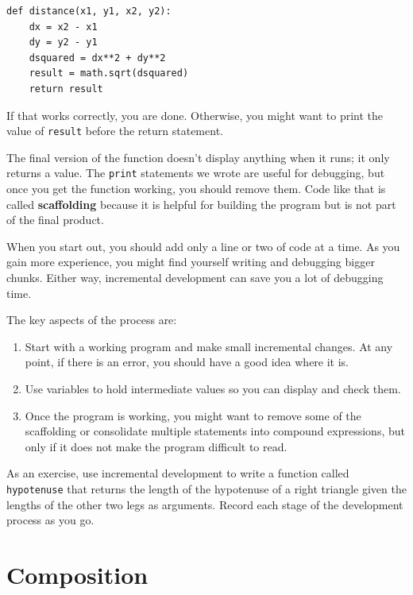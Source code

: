 \documentclass[10pt]{book}
\begin{document}
\begin{verbatim}
def distance(x1, y1, x2, y2):
    dx = x2 - x1
    dy = y2 - y1
    dsquared = dx**2 + dy**2
    result = math.sqrt(dsquared)
    return result
\end{verbatim}
%
If that works correctly, you are done.  Otherwise, you might
want to print the value of {\tt result} before the return
statement.

The final version of the function doesn't display anything when it
runs; it only returns a value.  The {\tt print} statements we wrote
are useful for debugging, but once you get the function working, you
should remove them.  Code like that is called {\bf scaffolding}
because it is helpful for building the program but is not part of the
final product.

When you start out, you should add only a line or two of code at a
time.  As you gain more experience, you might find yourself writing
and debugging bigger chunks.  Either way, incremental development
can save you a lot of debugging time.

The key aspects of the process are:

\begin{enumerate}

\item Start with a working program and make small incremental changes.
At any point, if there is an error, you should have a good idea
where it is.

\item Use variables to hold intermediate values so you can
display and check them.

\item Once the program is working, you might want to remove some of
the scaffolding or consolidate multiple statements into compound
expressions, but only if it does not make the program difficult to
read.

\end{enumerate}

As an exercise, use incremental development to write a function
called {\tt hypotenuse} that returns the length of the hypotenuse of a
right triangle given the lengths of the other two legs as arguments.
Record each stage of the development process as you go.



\section{Composition}
\end{document}
